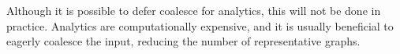 Although it is possible to defer coalesce for analytics, this will not
be done in practice.  Analytics are computationally expensive, and it
is usually beneficial to eagerly coalesce the input, reducing the
number of representative graphs.




